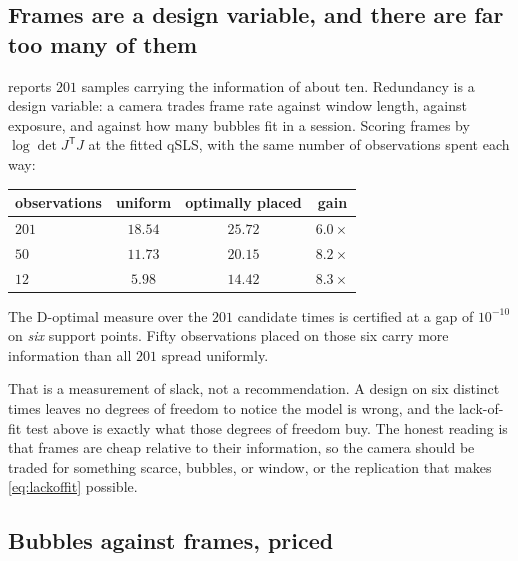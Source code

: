 \documentclass[10pt]{article}
\begin{document}
\subsection*{Frames are a design variable, and there are far too many of them}

 reports $201$ samples carrying the information of about ten. Redundancy
is a design variable: a camera trades frame rate against window length, against exposure, and
against how many bubbles fit in a session. Scoring frames by $\log\det J^{\mathsf T}J$ at the
fitted qSLS, with the same number of observations spent each way:

\begin{center}
\begin{tabular}{lccc}
\toprule
observations & uniform & optimally placed & gain \\
\midrule
$201$ & $18.54$ & $25.72$ & $6.0\times$ \\
$50$ & $11.73$ & $20.15$ & $8.2\times$ \\
$12$ & $5.98$ & $14.42$ & $8.3\times$ \\
\bottomrule
\end{tabular}
\end{center}

\noindent The D-optimal measure over the $201$ candidate times is certified at a gap of
$10^{-10}$ on \emph{six} support points. Fifty observations placed on those six carry more
information than all $201$ spread uniformly.

That is a measurement of slack, not a recommendation. A design on six distinct times leaves no
degrees of freedom to notice the model is wrong, and the lack-of-fit test above is exactly what
those degrees of freedom buy. The honest reading is that frames are cheap relative to their
information, so the camera should be traded for something scarce, bubbles, or window, or
the replication that makes \eqref{eq:lackoffit} possible.

\subsection*{Bubbles against frames, priced}
\label{sec:allocation}
\end{document}
